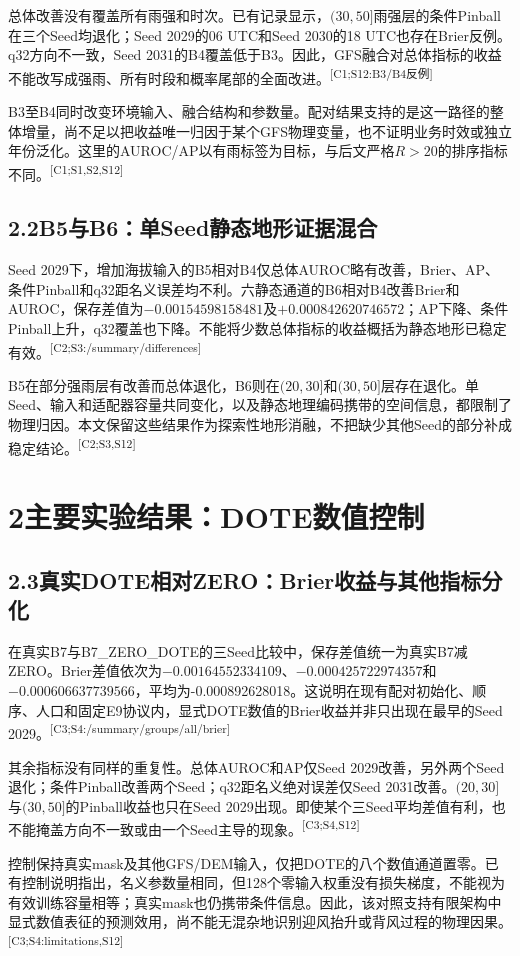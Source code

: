 \documentclass[UTF8,10.5pt,a4paper,fontset=none]{ctexart}
\newcommand{\evi}[1]{\textsuperscript{\textcolor{muted}{[#1]}}}
\newcommand{\nextpart}[1]{\clearpage\section*{#1}}
\begin{document}
总体改善没有覆盖所有雨强和时次。已有记录显示，$(30,50]$雨强层的条件Pinball在三个Seed均退化；Seed 2029的06 UTC和Seed 2030的18 UTC也存在Brier反例。q32方向不一致，Seed 2031的B4覆盖低于B3。因此，GFS融合对总体指标的收益不能改写成强雨、所有时段和概率尾部的全面改进。\evi{C1;S12:B3/B4反例}

B3至B4同时改变环境输入、融合结构和参数量。配对结果支持的是这一路径的整体增量，尚不足以把收益唯一归因于某个GFS物理变量，也不证明业务时效或独立年份泛化。这里的AUROC/AP以有雨标签为目标，与后文严格$R>20$的排序指标不同。\evi{C1;S1,S2,S12}

\subsection*{2.2\quad B5与B6：单Seed静态地形证据混合}
Seed 2029下，增加海拔输入的B5相对B4仅总体AUROC略有改善，Brier、AP、条件Pinball和q32距名义误差均不利。六静态通道的B6相对B4改善Brier和AUROC，保存差值为$-0.00154598158481$及$+0.000842620746572$；AP下降、条件Pinball上升，q32覆盖也下降。不能将少数总体指标的收益概括为静态地形已稳定有效。\evi{C2;S3:/summary/differences}

B5在部分强雨层有改善而总体退化，B6则在$(20,30]$和$(30,50]$层存在退化。单Seed、输入和适配器容量共同变化，以及静态地理编码携带的空间信息，都限制了物理归因。本文保留这些结果作为探索性地形消融，不把缺少其他Seed的部分补成稳定结论。\evi{C2;S3,S12}

\nextpart{2\quad 主要实验结果：DOTE数值控制}
\subsection*{2.3\quad 真实DOTE相对ZERO：Brier收益与其他指标分化}
在真实B7与B7\_ZERO\_DOTE的三Seed比较中，保存差值统一为真实B7减ZERO。Brier差值依次为$-0.00164552334109$、$-0.000425722974357$和$-0.000606637739566$，平均为-0.000892628018。这说明在现有配对初始化、顺序、人口和固定E9协议内，显式DOTE数值的Brier收益并非只出现在最早的Seed 2029。\evi{C3;S4:/summary/groups/all/brier}

其余指标没有同样的重复性。总体AUROC和AP仅Seed 2029改善，另外两个Seed退化；条件Pinball改善两个Seed；q32距名义绝对误差仅Seed 2031改善。$(20,30]$与$(30,50]$的Pinball收益也只在Seed 2029出现。即使某个三Seed平均差值有利，也不能掩盖方向不一致或由一个Seed主导的现象。\evi{C3;S4,S12}

控制保持真实mask及其他GFS/DEM输入，仅把DOTE的八个数值通道置零。已有控制说明指出，名义参数量相同，但128个零输入权重没有损失梯度，不能视为有效训练容量相等；真实mask也仍携带条件信息。因此，该对照支持有限架构中显式数值表征的预测效用，尚不能无混杂地识别迎风抬升或背风过程的物理因果。\evi{C3;S4:limitations,S12}
\end{document}
